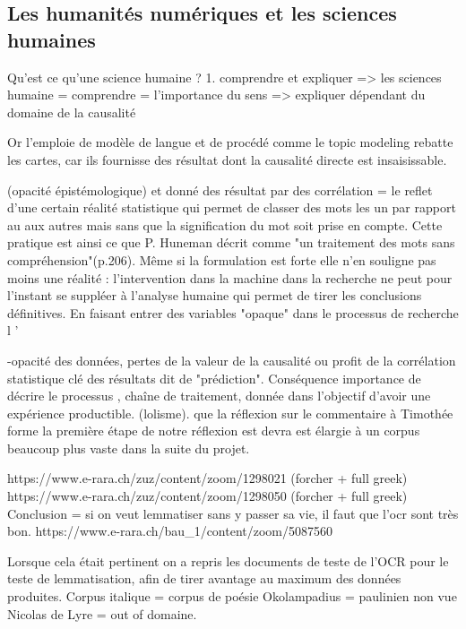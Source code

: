\subsection{Les humanités numériques et les sciences humaines}

Qu'est ce qu'une science humaine ? 
1. comprendre et expliquer 
=> les sciences humaine = comprendre = l'importance du sens
=> expliquer dépendant du domaine de la causalité 

Or l'emploie de modèle de langue et de procédé comme le topic modeling rebatte les cartes, car ils fournisse des résultat dont la causalité directe est insaisissable.

(opacité épistémologique) 
et donné des résultat par des corrélation = le reflet d'une certain réalité statistique qui permet de classer des mots les un par rapport au aux autres mais sans que la signification du mot soit prise en compte. Cette pratique est ainsi  ce que P. Huneman décrit comme "un traitement des mots sans compréhension"(p.206). Même si la formulation est forte elle n'en souligne pas moins une réalité : l'intervention dans la machine dans la recherche ne peut pour l'instant se suppléer à  l'analyse humaine qui permet de tirer les conclusions définitives. En faisant entrer des variables "opaque" dans le processus de recherche l '

-opacité des données, pertes de la valeur de la causalité ou profit de la corrélation statistique clé des résultats dit de "prédiction". Conséquence importance de décrire le processus , chaîne de traitement, donnée dans l'objectif d'avoir une expérience productible. (lolisme). que la réflexion sur le commentaire à Timothée forme la première étape de notre réflexion est devra est élargie à un corpus beaucoup plus vaste dans la suite du projet. 



https://www.e-rara.ch/zuz/content/zoom/1298021 (forcher + full greek)
https://www.e-rara.ch/zuz/content/zoom/1298050 (forcher + full greek)
Conclusion = si on veut lemmatiser sans y passer sa vie, il faut que l'ocr sont très bon. 
https://www.e-rara.ch/bau\_1/content/zoom/5087560

Lorsque cela était pertinent on a repris les documents de teste de l'OCR pour le teste de lemmatisation, afin de tirer avantage au maximum des données produites. 
Corpus italique = corpus de poésie
Okolampadius = paulinien non vue
Nicolas de Lyre = out of domaine. 

